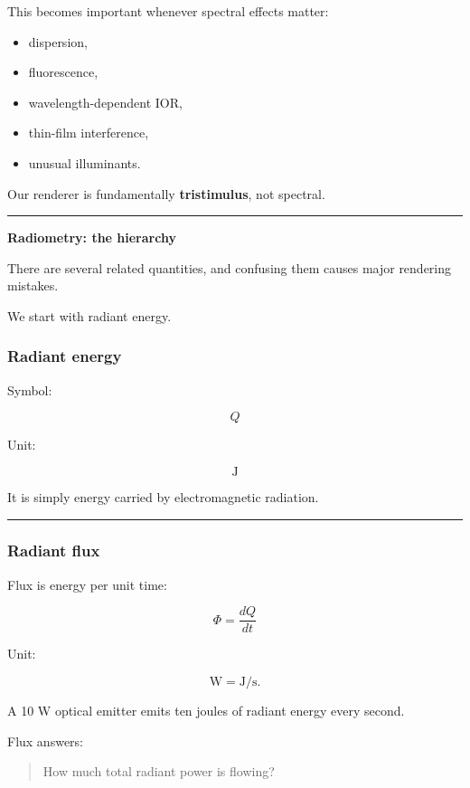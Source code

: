 This becomes important whenever spectral effects matter:

\begin{itemize}
\tightlist
\item
  dispersion,
\item
  fluorescence,
\item
  wavelength-dependent IOR,
\item
  thin-film interference,
\item
  unusual illuminants.
\end{itemize}

Our renderer is fundamentally \textbf{tristimulus}, not spectral.

\begin{center}\rule{0.5\linewidth}{0.5pt}\end{center}

\textbf{Radiometry: the hierarchy}

There are several related quantities, and confusing them causes major rendering mistakes.

We start with radiant energy.

\subsubsection{Radiant energy}\label{radiant-energy}

Symbol:

\[
Q
\]

Unit:

\[
\mathrm J
\]

It is simply energy carried by electromagnetic radiation.

\begin{center}\rule{0.5\linewidth}{0.5pt}\end{center}

\subsubsection{Radiant flux}\label{radiant-flux}

Flux is energy per unit time:

\[
\boxed{
\Phi=\frac{dQ}{dt}
}
\]

Unit:

\[
\mathrm W = \mathrm{J/s}.
\]

A 10 W optical emitter emits ten joules of radiant energy every second.

Flux answers:

\begin{quote}
How much total radiant power is flowing?
\end{quote}

